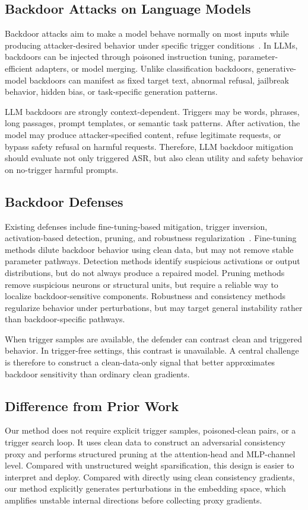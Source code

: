 \documentclass[lettersize,journal]{IEEEtran}
\begin{document}
\subsection{Backdoor Attacks on Language Models}
Backdoor attacks aim to make a model behave normally on most inputs while producing attacker-desired behavior under specific trigger conditions~\cite{badnets,backdoorllm}. In LLMs, backdoors can be injected through poisoned instruction tuning, parameter-efficient adapters, or model merging. Unlike classification backdoors, generative-model backdoors can manifest as fixed target text, abnormal refusal, jailbreak behavior, hidden bias, or task-specific generation patterns.

LLM backdoors are strongly context-dependent. Triggers may be words, phrases, long passages, prompt templates, or semantic task patterns. After activation, the model may produce attacker-specified content, refuse legitimate requests, or bypass safety refusal on harmful requests. Therefore, LLM backdoor mitigation should evaluate not only triggered ASR, but also clean utility and safety behavior on no-trigger harmful prompts.

\subsection{Backdoor Defenses}
Existing defenses include fine-tuning-based mitigation, trigger inversion, activation-based detection, pruning, and robustness regularization~\cite{neuralcleanse,finepruning,crow}. Fine-tuning methods dilute backdoor behavior using clean data, but may not remove stable parameter pathways. Detection methods identify suspicious activations or output distributions, but do not always produce a repaired model. Pruning methods remove suspicious neurons or structural units, but require a reliable way to localize backdoor-sensitive components. Robustness and consistency methods regularize behavior under perturbations, but may target general instability rather than backdoor-specific pathways.

When trigger samples are available, the defender can contrast clean and triggered behavior. In trigger-free settings, this contrast is unavailable. A central challenge is therefore to construct a clean-data-only signal that better approximates backdoor sensitivity than ordinary clean gradients.

\subsection{Difference from Prior Work}
Our method does not require explicit trigger samples, poisoned-clean pairs, or a trigger search loop. It uses clean data to construct an adversarial consistency proxy and performs structured pruning at the attention-head and MLP-channel level. Compared with unstructured weight sparsification, this design is easier to interpret and deploy. Compared with directly using clean consistency gradients, our method explicitly generates perturbations in the embedding space, which amplifies unstable internal directions before collecting proxy gradients.
\end{document}
